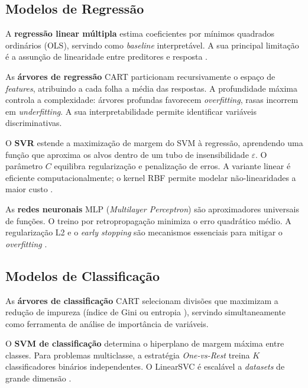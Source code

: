 \documentclass[conference]{IEEEtran}
\begin{document}
\subsection{Modelos de Regressão}

A \textbf{regressão linear múltipla} \cite{mitchell1997} estima coeficientes por mínimos quadrados ordinários (OLS), servindo como \textit{baseline} interpretável. A sua principal limitação é a assunção de linearidade entre preditores e resposta \cite{bishop2006}.

As \textbf{árvores de regressão} CART \cite{breiman1984} particionam recursivamente o espaço de \textit{features}, atribuindo a cada folha a média das respostas. A profundidade máxima controla a complexidade: árvores profundas favorecem \textit{overfitting}, rasas incorrem em \textit{underfitting}. A sua interpretabilidade permite identificar variáveis discriminativas.

O \textbf{SVR} \cite{vapnik1995} estende a maximização de margem do SVM à regressão, aprendendo uma função que aproxima os alvos dentro de um tubo de insensibilidade $\varepsilon$. O parâmetro $C$ equilibra regularização e penalização de erros. A variante linear é eficiente computacionalmente; o kernel RBF permite modelar não-linearidades a maior custo \cite{cortes1995}.

As \textbf{redes neuronais} MLP (\textit{Multilayer Perceptron}) \cite{haykin1999} são aproximadores universais de funções. O treino por retropropagação \cite{rumelhart1986} minimiza o erro quadrático médio. A regularização L2 e o \textit{early stopping} são mecanismos essenciais para mitigar o \textit{overfitting} \cite{goodfellow2016}.

\subsection{Modelos de Classificação}

As \textbf{árvores de classificação} CART \cite{breiman1984} selecionam divisões que maximizam a redução de impureza (índice de Gini ou entropia \cite{quinlan1986}), servindo simultaneamente como ferramenta de análise de importância de variáveis.

O \textbf{SVM de classificação} \cite{cortes1995} determina o hiperplano de margem máxima entre classes. Para problemas multiclasse, a estratégia \textit{One-vs-Rest} treina $K$ classificadores binários independentes. O LinearSVC é escalável a \textit{datasets} de grande dimensão \cite{pedregosa2011}.
\end{document}
